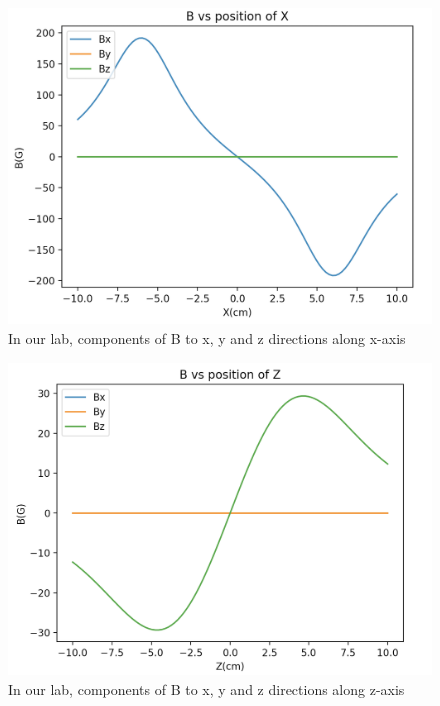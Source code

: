 \documentclass{article}
\begin{document}
\begin{figure}[h]
	\centering
	\includegraphics[scale=0.45]{OurBx}
	\caption{In our lab, components of B to x, y and z directions along x-axis}
\end{figure}

\begin{figure}[h]
	\centering
	\includegraphics[scale=0.45]{OurBz}
	\caption{In our lab, components of B to x, y and z directions along z-axis}
\end{figure}
\end{document}
